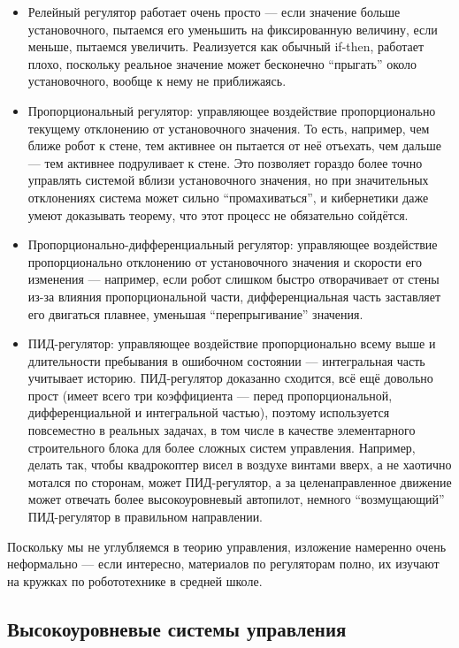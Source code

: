 \documentclass{../../text-style}
\begin{document}
\begin{itemize}
    \item Релейный регулятор работает очень просто --- если значение больше установочного, пытаемся его уменьшить на фиксированную величину, если меньше, пытаемся увеличить.
        Реализуется как обычный if-then, работает плохо, поскольку реальное значение может бесконечно \enquote{прыгать} около установочного, вообще к нему не приближаясь.
    \item Пропорциональный регулятор: управляющее воздействие пропорционально текущему отклонению от установочного значения.
        То есть, например, чем ближе робот к стене, тем активнее он пытается от неё отъехать, чем дальше --- тем активнее подруливает к стене.
        Это позволяет гораздо более точно управлять системой вблизи установочного значения, но при значительных отклонениях система может сильно \enquote{промахиваться}, и кибернетики даже умеют доказывать теорему, что этот процесс не обязательно сойдётся.
    \item Пропорционально-дифференциальный регулятор: управляющее воздействие пропорционально отклонению от установочного значения и скорости его изменения --- например, если робот слишком быстро отворачивает от стены из-за влияния пропорциональной части, дифференциальная часть заставляет его двигаться плавнее, уменьшая \enquote{перепрыгивание} значения.
    \item ПИД-регулятор: управляющее воздействие пропорционально всему выше и длительности пребывания в ошибочном состоянии --- интегральная часть учитывает историю.
        ПИД-регулятор доказанно сходится, всё ещё довольно прост (имеет всего три коэффициента --- перед пропорциональной, дифференциальной и интегральной частью), поэтому используется повсеместно в реальных задачах, в том числе в качестве элементарного строительного блока для более сложных систем управления.
        Например, делать так, чтобы квадрокоптер висел в воздухе винтами вверх, а не хаотично мотался по сторонам, может ПИД-регулятор, а за целенаправленное движение может отвечать более высокоуровневый автопилот, немного \enquote{возмущающий} ПИД-регулятор в правильном направлении.
\end{itemize}

Поскольку мы не углубляемся в теорию управления, изложение намеренно очень неформально --- если интересно, материалов по регуляторам полно, их изучают на кружках по робототехнике в средней школе.

\subsection{Высокоуровневые системы управления}
\end{document}
